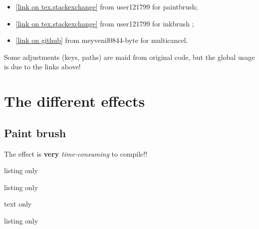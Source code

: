 \documentclass[11pt,a4paper]{ltxdoc}
\begin{document}
\begin{itemize}
  \item \href{https://tex.stackexchange.com/questions/475141/simulating-paintbrush-strokes-in-tikz}{[link on tex.stackexchange]} from \textsf{user121799} for paintbrush;
  \item \href{https://tex.stackexchange.com/questions/460836/custom-line-cap-to-simulate-inked-line-in-tikz/460842#460842}{[link on tex.stackexchange]} from \textsf{user121799} for inkbrush ;
  \item \href{https://github.com/meyvenil0844-byte/-multicancel}{[link on github]} from \textsf{meyvenil0844-byte} for multicancel.
\end{itemize}

Some adjustments (keys, paths) are maid from original code, but the global usage is due to the links above!

\pagebreak

\section{The different effects}

\subsection{Paint brush}

{\small\faBomb} The effect is \textbf{very} \textit{time-consuming} to compile!!

\begin{DemoCode}{listing only}

\end{DemoCode}

\begin{DemoCode}{listing only}
\end{DemoCode}

\begin{DemoCode}{text only}

\end{DemoCode}

\begin{DemoCode}{listing only}
\end{DemoCode}
\end{document}
